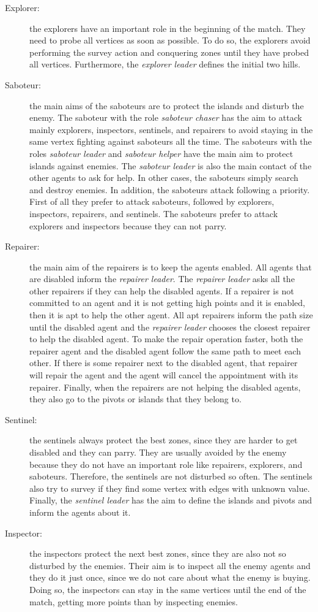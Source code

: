 \begin{description}
 \item[Explorer:] the explorers have an important role in the beginning of the match. They need to probe all vertices as soon as possible. To do so, the explorers avoid performing the survey action and conquering zones until they have probed all vertices. Furthermore, the \emph{explorer leader} defines the initial two hills.
 \item[Saboteur:] the main aims of the saboteurs are to protect the islands and disturb the enemy. The saboteur with the role \emph{saboteur chaser} has the aim to attack mainly explorers, inspectors, sentinels, and repairers to avoid staying in the same vertex fighting against saboteurs all the time. The saboteurs with the roles \emph{saboteur leader} and \emph{saboteur helper} have the main aim to protect islands against enemies. The \emph{saboteur leader} is also the main contact of the other agents to ask for help. In other cases, the saboteurs simply search and destroy enemies. In addition, the saboteurs attack following a priority. First of all they prefer to attack saboteurs, followed by explorers, inspectors, repairers, and sentinels. The saboteurs prefer to attack explorers and inspectors because they can not parry.
 \item[Repairer:] the main aim of the repairers is to keep the agents enabled. All agents that are disabled inform the \emph{repairer leader}. The \emph{repairer leader} asks all the other repairers if they can help the disabled agents. If a repairer is not committed to an agent and it is not getting high points and it is enabled, then it is apt to help the other agent. All apt repairers inform the path size until the disabled agent and the \emph{repairer leader} chooses the closest repairer to help the disabled agent. To make the repair operation faster, both the repairer agent and the disabled agent follow the same path to meet each other. If there is some repairer next to the disabled agent, that repairer will repair the agent and the agent will cancel the appointment with its repairer. Finally, when the repairers are not helping the disabled agents, they also go to the pivots or islands that they belong to.
 \item[Sentinel:] the sentinels always protect the best zones, since they are harder to get disabled and they can parry. They are usually avoided by the enemy because they do not have an important role like repairers, explorers, and saboteurs. Therefore, the sentinels are not disturbed so often. The sentinels also try to survey if they find some vertex with edges with unknown value. Finally, the \emph{sentinel leader} has the aim to define the islands and pivots and inform the agents about it.
 \item[Inspector:] the inspectors protect the next best zones, since they are also not so disturbed by the enemies. Their aim is to inspect all the enemy agents and they do it just once, since we do not care about what the enemy is buying. Doing so, the inspectors can stay in the same vertices until the end of the match, getting more points than by inspecting enemies.
\end{description}

